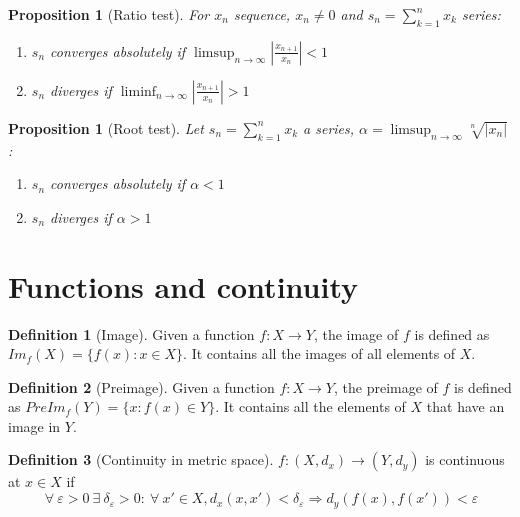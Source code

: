 \documentclass{article}
\newcommand{\DS}{\displaystyle}
\newcommand{\abs}[1]{\left|#1\right|}
\newcommand{\Ar}{\Rightarrow}
\newenvironment{enumrom}{\begin{enumerate}[label=(\roman*)]}{\end{enumerate}}
\newcommand{\fr}[2]{\frac{#1}{#2}}
\newcommand{\f}[3]{#1 : #2 \rightarrow #3}
\newcommand{\limsupn}{\limsup_{n \to \infty}}
\newcommand{\liminfn}{\liminf_{n \to \infty}}
\theoremstyle{definition}
\newtheorem{definition}{Definition}[section]
\theoremstyle{definition}
\theoremstyle{plain}
\theoremstyle{plain}
\theoremstyle{plain}
\theoremstyle{plain}
\newtheorem{proposition}[theorem]{Proposition}
\theoremstyle{definition}
\theoremstyle{remark}
\theoremstyle{remark}
\theoremstyle{remark}
\theoremstyle{remark}
\newcommand{\sumn}{\sum_{k=1}^n}
\newcommand{\ForAll}{\ \forall \ }
\newcommand{\Exists}{\ \exists \ }
\newcommand{\E}{\varepsilon}
\begin{document}
\begin{proposition}[Ratio test]
  For $x_n$ sequence, $x_n \neq 0$ and $\DS s_n = \sumn{x_k}$ series:
  \begin{enumrom}
    \item $s_n$ converges absolutely if $\limsupn \abs{\fr{x_{n+1}}{x_n}} < 1$
    \item $s_n$ diverges if $\liminfn \abs{\fr{x_{n+1}}{x_n}} > 1$
  \end{enumrom}
\end{proposition}




\begin{proposition}[Root test]
  Let $\DS s_n = \sumn{x_k}$ a series, $\DS \alpha = \limsupn \sqrt[n]{\abs{x_n}}$:
  \begin{enumrom}
    \item $s_n$ converges absolutely if $\alpha < 1$
    \item $s_n$ diverges if $\alpha > 1$
  \end{enumrom}
\end{proposition}





\section{Functions and continuity}


\begin{definition}[Image]
  Given a function $\f{f}{X}{Y}$, the image of $f$ is defined as $Im_f(X) = \{ f(x) : x \in X \}$. It contains all the images of all elements of $X$.
\end{definition}


\begin{definition}[Preimage]
  Given a function $\f{f}{X}{Y}$, the preimage of $f$ is defined as $PreIm_f(Y) = \{ x : f(x) \in Y \}$. It contains all the elements of $X$ that have an image in $Y$.
\end{definition}


\begin{definition}[Continuity in metric space]
  $\f{f}{(X,d_x)}{(Y,d_y)}$ is continuous at $x \in X$ if
  \[
    \ForAll \E > 0 \Exists \delta_\E > 0 : \ForAll x' \in X,
    d_x(x,x') < \delta_\E \Ar d_y(f(x),f(x')) < \E
  \]
\end{definition}
\end{document}
